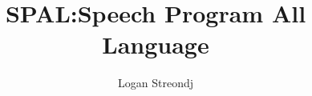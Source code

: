 \documentclass{report}
\title{SPAL:\@ Speech Program All Language}
\author{Logan Streondj}
\begin{document}
%





\printbibliography{}
\end{document}
